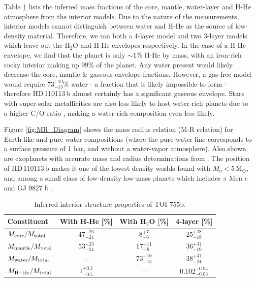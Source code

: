 \documentclass[fleqn,usenatbib]{mnras}
\newcommand{\mearth}{M$_{\oplus}$}
\newcommand{\Tplanet}{HD\,110113\,b}
\begin{document}
Table \ref{tab:interior} lists the inferred mass fractions of the core, mantle, water-layer and H-He atmosphere from the interior models.
Due to the nature of the measurements, interior models cannot distinguish between water and H-He as the source of low-density material. 
Therefore, we ran both a 4-layer model and two 3-layer models which leave out the H$_{2}$O and H-He envelopes respectively.
In the case of a H-He envelope, we find that the planet is only $\sim1$\% H-He by mass, with an iron-rich rocky interior making up 99\% of the planet.
Any water present would likely decrease the core, mantle \& gaseous envelope fractions.
However, a gas-free model would require $73 ^{+10} _{-13}$\% water - a fraction that is likely impossible to form - therefore \Tplanet{} almost certainly has a significant gaseous envelope.
Stars with super-solar metallicities are also less likely to host water-rich planets due to a higher C/O ratio \citep{bitsch2020influence}, making a water-rich composition even less likely.

Figure \ref{fig:MR_Diagram} shows the mass radius relation (M-R relation) for Earth-like and pure water compositions (where the pure water line corresponds to a surface pressure of 1 bar, and without a water-vapor atmosphere).
Also shown are exoplanets with accurate mass and radius determinations from \citet{otegi2020revisited}.
The position of \Tplanet{} makes it one of the lowest-density worlds found with $M_p<5$\,\mearth{}, and among a small class of low-density low-mass planets which includes $\pi{}$ Men c \citep{huang2018tess} and GJ 9827 b \citep{niraula2017three}.

\begin{table}
\caption{Inferred interior structure properties of TOI-755b.}
\label{tab:interior}
\begin{tabular}{lccc}
\hline
\hline
Constituent & With H-He [\%] & With H$_{2}$O [\%] & 4-layer [\%] \\
\hline
\hline
$M_{\rm core}/M_{\rm total}$ & $47 ^{+26} _{-24} $ & $8 ^{+7} _{-6}$ & $25 ^{+28} _{-18}$\\
$M_{\rm mantle}/M_{\rm total}$ & $ 53 ^{+23} _{-24} $ & $17 ^{+11} _{-9}$ & $36 ^{+31} _{-19}$\\
$M_{\rm water}/M_{\rm total}$ & --- & $73 ^{+10} _{-13}$ & $38 ^{+31} _{-24}$\\
$M_{\rm H-He}/M_{\rm total}$ & $1 ^{+0.3} _{-0.5}$ & --- & $0.102  ^{+0.04} _{-0.03}$\\
\hline
\hline
\end{tabular}
\end{table}
\end{document}

